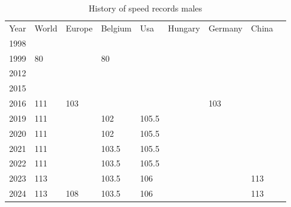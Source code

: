 \begin{table}[]
    \begin{tabular}{lllllllll}
        Year & World & Europe & Belgium & Usa   & Hungary & Germany & China \\
        1998 &       &        &         &       &         &         &       \\
        1999 & 80    &        & 80      &       &         &         &       \\
        2012 &       &        &         &       &         &         &       \\
        2015 &       &        &         &       &         &         &       \\
        2016 & 111   & 103    &         &       &         & 103     &       \\
        2019 & 111   &        & 102     & 105.5 &         &         &       \\
        2020 & 111   &        & 102     & 105.5 &         &         &       \\
        2021 & 111   &        & 103.5   & 105.5 &         &         &       \\
        2022 & 111   &        & 103.5   & 105.5 &         &         &       \\
        2023 & 113   &        & 103.5   & 106   &         &         & 113   \\
        2024 & 113   & 108    & 103.5   & 106   &         &         & 113
    \end{tabular}
    \caption{History of speed records males}
    \label{tbl:speed-records-history-male}
\end{table}

